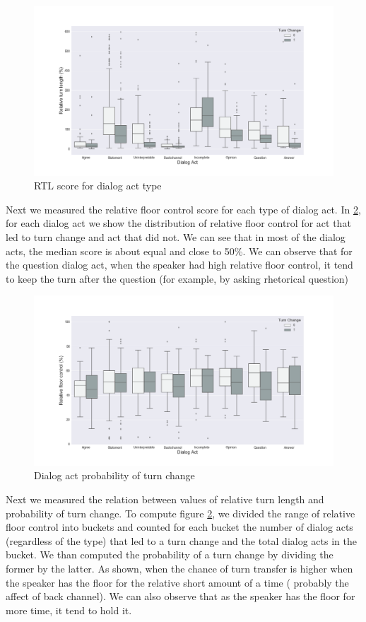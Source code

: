 \begin{figure}[ht!]
\centering
\includegraphics[width=\textwidth]{../scikitlearn/figures/f3.png}
\caption{RTL score for dialog act type\label{overflow}}
\label{f3}
\end{figure}

Next we measured the relative floor control score for each type of dialog act.
In \ref{f4}, for each dialog act we show the distribution of relative floor control for act that
led to turn change and act that did not. We can see that in most of the dialog acts,
the median score is about equal and close to 50\%. We can observe that for the question dialog act, when the speaker had high relative floor control, it tend to keep the turn after the question (for example, by asking rhetorical question) 

\begin{figure}[ht!]
\centering
\includegraphics[width=\textwidth]{../scikitlearn/figures/f4.png}
\caption{Dialog act probability of turn change\label{overflow}}
\label{f4}
\end{figure}

Next we measured the relation between values of relative turn length and probability of turn change. 
To compute figure \ref{f4}, we divided the range of relative floor control into buckets and counted for each bucket the number of dialog acts (regardless of the type) that led to a turn change and the total dialog acts in the bucket.
We than computed the probability of a turn change by dividing the former by the latter. As shown, when the chance of turn transfer is higher when the speaker has the floor for the relative short amount of a time ( probably the affect of back channel). We can also observe that as the speaker has the floor for more time, it tend to hold it.


